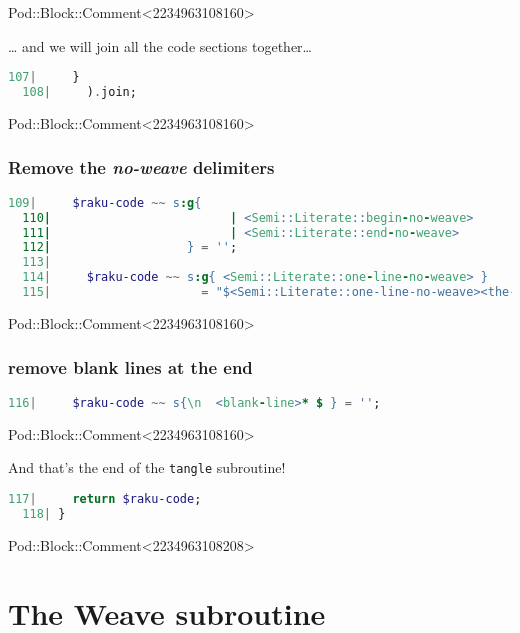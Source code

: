 \documentclass{scrartcl}
\begin{document}
Pod::Block::Comment<2234963108160>

… and we will join all the code sections together…

\begin{lstlisting}[language=Raku]
  107|     } 
  108|     ).join;

\end{lstlisting}


Pod::Block::Comment<2234963108160>

\subsubsection{Remove the \textit{no-weave} delimiters}

\begin{lstlisting}[language=Raku]
  109|     $raku-code ~~ s:g{
  110|                         | <Semi::Literate::begin-no-weave>
  111|                         | <Semi::Literate::end-no-weave>
  112|                   } = '';
  113| 
  114|     $raku-code ~~ s:g{ <Semi::Literate::one-line-no-weave> }
  115|                     = "$<Semi::Literate::one-line-no-weave><the-code>\n";

\end{lstlisting}


Pod::Block::Comment<2234963108160>

\subsubsection{remove blank lines at the end}

\begin{lstlisting}[language=Raku]
  116|     $raku-code ~~ s{\n  <blank-line>* $ } = '';

\end{lstlisting}


Pod::Block::Comment<2234963108160>

And that's the end of the \texttt{tangle} subroutine!

\begin{lstlisting}[language=Raku]
  117|     return $raku-code;
  118| } 

\end{lstlisting}


Pod::Block::Comment<2234963108208>

\section{The Weave subroutine}
\end{document}
